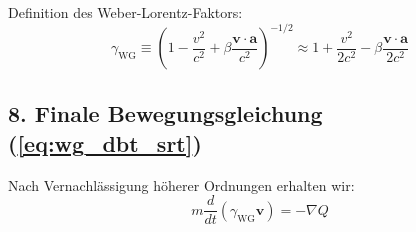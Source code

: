 Definition des Weber-Lorentz-Faktors:
\begin{equation}
\gamma_{\text{WG}} \equiv \left(1 - \frac{v^2}{c^2} + \beta\frac{\mathbf{v}\cdot\mathbf{a}}{c^2}\right)^{-1/2} \approx 1 + \frac{v^2}{2c^2} - \beta\frac{\mathbf{v}\cdot\mathbf{a}}{2c^2}
\end{equation}

\subsection*{8. Finale Bewegungsgleichung (\ref{eq:wg_dbt_srt})}
Nach Vernachlässigung höherer Ordnungen erhalten wir:
\begin{equation}
m\frac{d}{dt}(\gamma_{\text{WG}}\mathbf{v}) = -\nabla Q
\end{equation}
